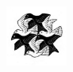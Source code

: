 
\begin{titlepage}

\begin{addmargin}[-1cm]{-3cm}
\begin{center}
\large

\hfill
\vfill

\begingroup
\color{Maroon}
\spacedallcaps{\myTitle} \\ \bigskip %
\endgroup

\spacedlowsmallcaps{\myName} %

\vfill

\includegraphics[width=2cm]{img/Birds.eps} \\ \medskip %

\myDepartment \\
\myUni \\ \bigskip

\myTime%

\vfill

\end{center}
\end{addmargin}

\end{titlepage}